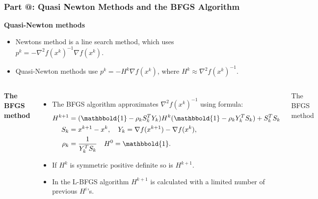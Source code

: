 \documentclass[9pt]{beamer}
\makeatletter
\newcommand*{\rom}[1]{\expandafter\@slowromancap\romannumeral #1@}
\makeatother
\begin{document}
\begin{frame}
\frametitle{\textbf{ Part \rom{3}:} Quasi Newton Methods and the BFGS Algorithm}
\textbf{Quasi-Newton methods}
\begin{itemize}
\item{Newtons method is a line search method, which uses $p^k=-\nabla^2f(x^k)^{-1}\nabla f(x^k)$.}
\item{Quasi-Newton methods use $p^k=-H^k\nabla f(x^k)$, where $H^k\approx \nabla^2f(x^k)^{-1}$.}
\end{itemize}
\begin{columns}
\textbf{The BFGS method}
\begin{itemize}
\item{The BFGS algorithm approximates $\nabla^2f(x^k)^{-1}$ using formula:{\small
\begin{align*}
H^{k+1} &= (\mathbbold{1}-\rho_kS_k^T Y_k)H^k(\mathbbold{1} -\rho_kY_k^T S_k) + S_k^T S_k\\
S_k &= x^{k+1}-x^{k},
\quad Y_k = \nabla f(x^{k+1})-\nabla f(x^{k}),\\
\rho_k &= \frac{1}{Y_k^T S_k}\quad H^0=\mathbbold{1}.
\end{align*}
}
}
\item{If $H^k$ is symmetric positive definite so is $H^{k+1}$. }
\item{In the L-BFGS algorithm $H^{k+1}$ is calculated with a limited number of previous $H^i$'s.}
\end{itemize}
{\small
\begin{algorithm}[H] 
\caption{The BFGS method\label{SEQ_ALG}}
\end{algorithm}
}
\end{columns}
\end{frame}
\end{document}
